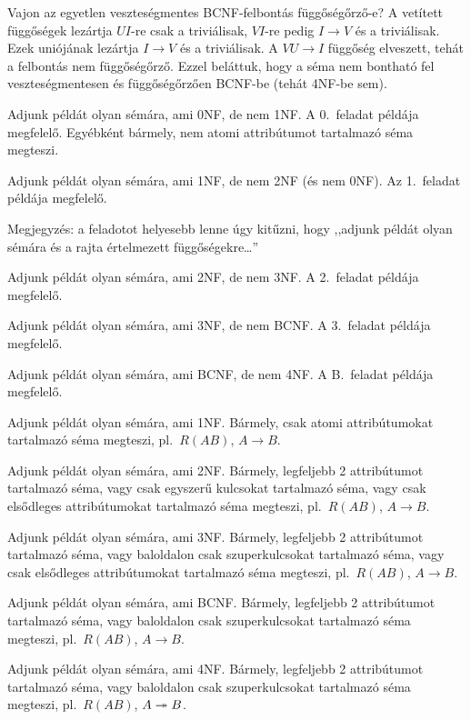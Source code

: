 \documentclass[a5paper]{article}
\begin{document}
Vajon az egyetlen veszteségmentes BCNF-felbontás függőségőrző-e? A vetített
függőségek lezártja $UI$-re csak a triviálisak, $VI$-re pedig $I\to V$ és a
triviálisak. Ezek uniójának lezártja $I\to V$ és a triviálisak. A $VU\to I$
függőség elveszett, tehát a felbontás nem függőségőrző. Ezzel beláttuk, hogy
a séma nem bontható fel veszteségmentesen és függőségőrzően BCNF-be (tehát
4NF-be sem).

Adjunk példát olyan sémára, ami 0NF, de nem 1NF.
\megoldas A 0.\ feladat példája megfelelő. Egyébként bármely, nem atomi
attribútumot tartalmazó séma megteszi.


Adjunk példát olyan sémára, ami 1NF, de nem 2NF (és nem 0NF).
\megoldas Az 1.\ feladat példája megfelelő.

Megjegyzés: a feladotot helyesebb lenne úgy kitűzni, hogy ,,adjunk példát
olyan sémára és a rajta értelmezett függőségekre\ldots''


Adjunk példát olyan sémára, ami 2NF, de nem 3NF.
\megoldas A 2.\ feladat példája megfelelő.

Adjunk példát olyan sémára, ami 3NF, de nem BCNF.
\megoldas A 3.\ feladat példája megfelelő.

Adjunk példát olyan sémára, ami BCNF, de nem 4NF.
\megoldas A B.\ feladat példája megfelelő.

Adjunk példát olyan sémára, ami 1NF.
\megoldas
Bármely, csak atomi attribútumokat tartalmazó séma megteszi, pl.\ $R(AB)$,
$A\to B$.

Adjunk példát olyan sémára, ami 2NF.
\megoldas Bármely, legfeljebb 2 attribútumot tartalmazó séma, vagy csak
egyszerű kulcsokat tartalmazó séma, vagy csak elsődleges attribútumokat
tartalmazó séma megteszi, pl.\ $R(AB)$, $A\to B$.

Adjunk példát olyan sémára, ami 3NF.
\megoldas Bármely, legfeljebb 2 attribútumot tartalmazó séma, vagy
baloldalon csak szuperkulcsokat tartalmazó séma, vagy csak elsődleges
attribútumokat tartalmazó séma megteszi, pl.\ $R(AB)$, $A\to B$.

Adjunk példát olyan sémára, ami BCNF.
\megoldas Bármely, legfeljebb 2 attribútumot tartalmazó séma, vagy
baloldalon csak szuperkulcsokat tartalmazó séma megteszi,
pl.\ $R(AB)$, $A\to B$.

Adjunk példát olyan sémára, ami 4NF.
\megoldas Bármely, legfeljebb 2 attribútumot tartalmazó séma, vagy
baloldalon csak szuperkulcsokat tartalmazó séma megteszi,
pl.\ $R(AB)$, $A\twoheadrightarrow B$.
\end{document}
